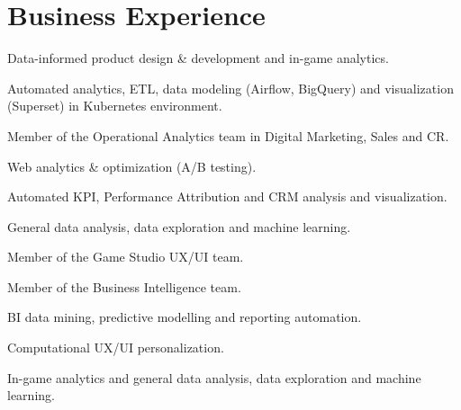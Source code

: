 \documentclass[]{deedy-resume-openfont}
\begin{document}
\begin{minipage}[t]{0.66\textwidth} 


\section{Business Experience}
\vspace{\topsep} %
\begin{tightemize}
\item Data-informed product design \& development and in-game analytics.
\item Automated analytics, ETL, data modeling (Airflow, BigQuery) and visualization (Superset) in Kubernetes environment.
\end{tightemize}

\begin{tightemize}
\item Member of the Operational Analytics team in Digital Marketing, Sales and CR.
\item Web analytics \& optimization (A/B testing).
\item Automated KPI, Performance Attribution and CRM analysis and visualization.
\item General data analysis, data exploration and machine learning.
\end{tightemize}

\begin{tightemize}
\item Member of the Game Studio UX/UI team.
\item Member of the Business Intelligence team.
\item BI data mining, predictive modelling and reporting automation.
\item Computational UX/UI personalization.
\item In-game analytics and general data analysis, data exploration and machine learning.
\end{tightemize}



\end{minipage}
\end{document}
